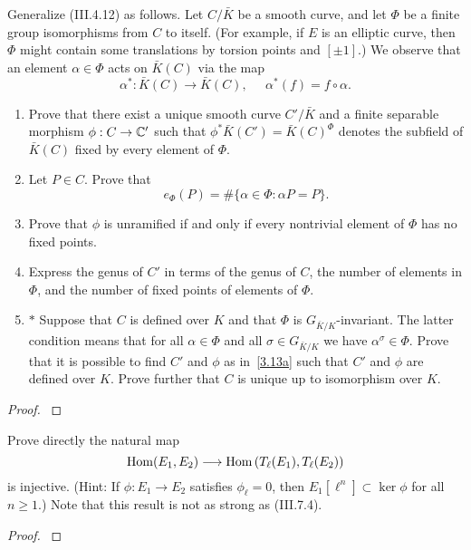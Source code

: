 \documentclass[12pt,reqno]{amsart}
\begin{document}
\begin{exe}\label{3.13}
Generalize (III.4.12) as follows.  Let $C/\bar{K}$ be a smooth curve, and let $\Phi$ be a finite group isomorphisms from $C$ to itself.  (For example, if $E$ is an elliptic curve, then $\Phi$ might contain some translations by torsion points and $[\pm 1]$.)  We observe that an element $\alpha \in \Phi$ acts on $\bar{K}(C)$ via the map
\[
\alpha^\ast: \bar{K}(C)\longrightarrow \bar{K}(C),\;\;\;\;\;\alpha^\ast (f)=f\circ \alpha.
\] 
\begin{enumerate}
\item\label{3.13a}
Prove that there exist a unique smooth curve $C'/\bar{K}$ and a finite separable morphism $\phi: C \to {\mathbb C}'$ such that $\phi^\ast \bar{K}(C')=\bar{K}(C)^\Phi$ denotes the subfield of $\bar{K}(C)$ fixed by every element of $\Phi$.

\item\label{3.13b}
Let $P\in C$.  Prove that
\[
e_\Phi(P)=\# \{\alpha \in \Phi: \alpha P=P\}.
\]

\item\label{3.13c}
Prove that $\phi$ is unramified if and only if every nontrivial element of $\Phi$ has no fixed points.

\item\label{3.13d}
Express the genus of $C'$ in terms of the genus of $C$, the number of elements in $\Phi$, and the number of fixed points of elements of $\Phi$.

\item\label{3.13e}
$\ast$ Suppose that $C$ is defined over $K$ and that $\Phi$ is $G_{\bar{K}/K}$-invariant.  The latter condition means that for all $\alpha \in \Phi$ and all $\sigma \in G_{\bar{K}/K}$ we have $\alpha^\sigma \in \Phi$.  Prove that it is possible to find $C'$ and $\phi$ as in~\ref{3.13a} such that $C'$ and $\phi$ are defined over $K$.   Prove further that $C$ is unique up to isomorphism over $K$.
\end{enumerate}
\begin{proof}\label{s3.13}

\end{proof} 
\end{exe} 

\begin{exe}\label{3.14}
Prove directly the natural map
\[
{\operatorname{Hom}}(E_1, E_2) \longrightarrow {\operatorname{Hom}}\left(T_\ell(E_1), T_\ell(E_2)\right)
\]
is injective.  (Hint: If $\phi: E_1 \to E_2$ satisfies $\phi_\ell =0$, then $E_1[\ell^n]\subset \ker \phi$ for all $n\geq 1$.)  Note that this result is not as strong as (III.7.4).
\begin{proof}\label{s3.14}

\end{proof} 
\end{exe} 
\end{document}
